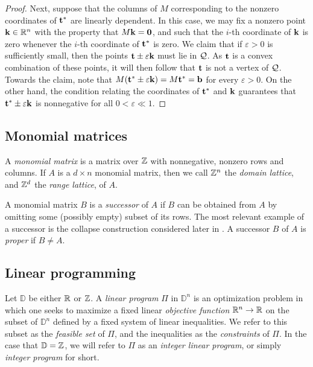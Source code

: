 \documentclass[11pt]{amsart}
\renewcommand{\!}[1]{{\color{red}\text{$\star$\,}#1\,$\star$}}
\begin{document}
\begin{proof}
Next, suppose that the columns of $M$ corresponding to the nonzero coordinates of $\mathbf{t}^{\ast}$ are linearly dependent.   In this case, we may fix a nonzero point $\mathbf{k} \in \mathbb{R}^n$ with the property that $M \mathbf{k} = \mathbf{0}$, and such that the $i$-th coordinate of $\mathbf{k}$ is zero whenever the $i$-th coordinate of $\mathbf{t}^{\ast}$ is zero.  We claim that if $\varepsilon > 0$ is sufficiently small, then the points $\mathbf{t} \pm \varepsilon \mathbf{k}$ must lie in $\mathcal{Q}$.   As $\mathbf{t}$ is a convex combination of these points, it will then follow that $\mathbf{t}$ is not a vertex of $\mathcal{Q}$.  Towards the claim, note that $M(\mathbf{t}^{\ast} \pm \varepsilon \mathbf{k}) = M \mathbf{t}^{\ast} = \mathbf{b}$ for every $\varepsilon > 0$.  On the other hand, the condition relating the coordinates of $\mathbf{t}^{\ast}$ and $\mathbf{k}$ guarantees that $\mathbf{t}^{\ast} \pm \varepsilon \mathbf{k}$ is nonnegative for all $0 < \varepsilon \ll 1$.  
%
\end{proof}



\subsection{Monomial matrices}  A \emph{monomial matrix} is a matrix over $\mathbb{Z}$ with nonnegative, nonzero rows and columns.   If $A$ is a $d \times n$ monomial matrix, then we call $\mathbb{Z}^n$ the \emph{domain lattice}, and $\mathbb{Z}^d$ the \emph{range lattice}, of $A$.

A  monomial matrix $B$ is a \emph{successor} of $A$ if $B$ can be obtained from $A$ by omitting some (possibly empty) subset of its rows.   The most relevant example of a successor is the collapse construction considered later in .  A successor $B$ of $A$ is  \emph{proper} if $B \neq A$. 


\subsection{Linear programming}  

Let $\mathbb{D}$ be either $\mathbb{R}$ or $\mathbb{Z}$.  A \emph{linear program} $\Pi$ in $\mathbb{D}^n$ is an optimization problem in which one seeks to maximize a fixed linear \emph{objective function} $\mathbb{R}^n \to \mathbb{R}$ on the subset of $\mathbb{D}^n$ defined by a fixed system of linear inequalities.  We refer to this subset as the \emph{feasible set} of $\Pi$, and the inequalities as the \emph{constraints} of $\Pi$.  In the case that $\mathbb{D} = \mathbb{Z}$, we will refer to $\Pi$ as an \emph{integer linear program}, or simply \emph{integer program} for short.  
\end{document}
